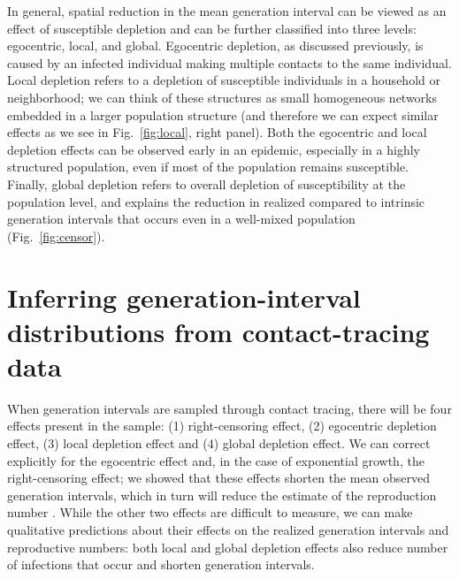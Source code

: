 \documentclass[12pt]{article}
\newcommand{\fref}[1]{Fig.~\ref{fig:#1}}
\newcommand{\rev}[1]{}
\begin{document}
In general, spatial reduction in the mean generation interval can be viewed as an effect of susceptible depletion and can be further classified into three levels: egocentric, local, and global.
Egocentric depletion, as discussed previously, is caused by an infected individual making multiple contacts to the same individual.
Local depletion refers to a depletion of susceptible individuals in a household or neighborhood;
we can think of these structures as small homogeneous networks embedded in a larger population structure (and therefore we can expect similar effects as we see in \fref{local}, right panel).
Both the egocentric and local depletion effects can be observed early in an epidemic, especially in a highly structured population, even if most of the population remains susceptible.
Finally, global depletion refers to overall depletion of susceptibility at the population level, and explains the reduction in realized compared to intrinsic generation intervals that occurs even in a well-mixed population (\fref{censor}). 

\section{Inferring generation-interval distributions from contact-tracing data}
\rev{
some of the 4 effects described also affect R whereas others don't. Be more clear to the reader. For instance, the ordinare Euler-Lotka equations is not fulfilled in network situation. I think Ball, Pellis and Trapman have investigated different reproduction numbers for network epidemics and related.
}

When generation intervals are sampled through contact tracing, there will be four effects present in the sample: (1) right-censoring effect, (2) egocentric depletion effect, (3) local depletion effect and (4) global depletion effect.
We can correct explicitly for the egocentric effect and, in the case of exponential growth, the right-censoring effect;
we showed that these effects shorten the mean observed generation intervals, which in turn will reduce the estimate of the reproduction number \cite{wallinga2007generation, park2019practical}.
While the other two effects are difficult to measure, we can make qualitative predictions about their effects on the realized generation intervals and reproductive numbers: 
both local and global depletion effects also reduce number of infections that occur and shorten generation intervals.
\end{document}
